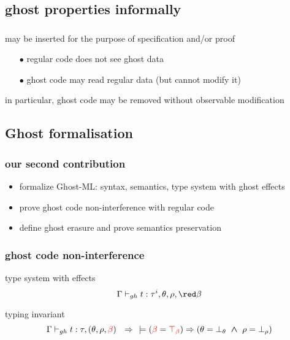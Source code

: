 \documentclass[xcolor=dvipsnames]{beamer}
\newcommand{\bwedge}{\boldsymbol{~\wedge~}}
\newcommand{\gb}{\beta}
\newcommand{\gbt}{\top_\beta}
\newcommand{\gbr}{\textcolor{red}{\gb}}
\newcommand{\gbtr}{\textcolor{red}{\gbt}}
\newcommand{\bth}{\bot_\theta}
\newcommand{\brh}{\bot_\rho}
\begin{document}
\subsection*{ghost properties informally}

\begin{frame}
\frametitle{}
	may be inserted for the purpose of specification and/or proof \\[1em]
	\pause	
	\begin{itemize}
	\item[\red $\bullet$] regular code does not see ghost data
	\item[\red $\bullet$] ghost code may read regular data (but cannot modify it)\\[1em]
	\end{itemize}
in particular, ghost code may be removed without observable modification
\end{frame}




\subsection*{Ghost formalisation}


\begin{frame}
\frametitle{our second contribution}
\begin{itemize}
\item formalize Ghost-ML: syntax, semantics, type system with ghost effects \pause
\item prove ghost code non-interference with regular code \pause
\item define ghost erasure and prove semantics preservation  
\end{itemize}
\end{frame}

\begin{frame}
\frametitle{ghost code non-interference}
type system with effects 
$$\Gamma \vdash_{gh} t: \tau^{i}, \theta, \rho, {\red \beta} $$

\bigskip\pause
typing invariant 
$$\Gamma \vdash_{gh} t : \tau, (\theta, \rho, \gbr) 
 ~~ \Rightarrow ~~
\models (\gbr = \gbtr) \Rightarrow (\theta = \bth \bwedge \rho = \brh) $$
\end{frame}
\end{document}
